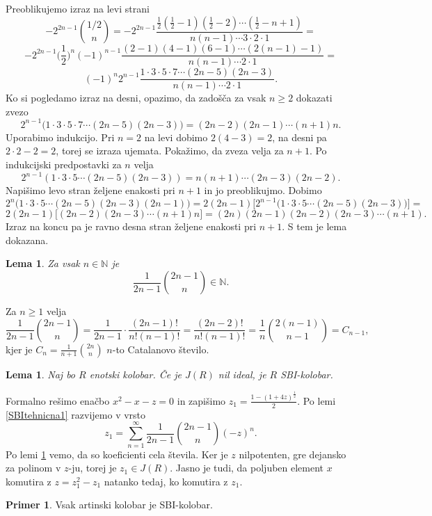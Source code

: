 \documentclass[a4paper, 12pt]{amsart}
\theoremstyle{definition} %
\newtheorem{primer}[definicija]{Primer}
\theoremstyle{plain} %
\newtheorem{lema}[definicija]{Lema}
\newcommand{\N}{\mathbb N}
\begin{document}
Preoblikujemo izraz na levi strani
$$
-2^{2n-1} {1/2 \choose n} = -2^{2n-1} \frac{\frac{1}{2}(\frac{1}{2}-1)(\frac{1}{2} - 2)\cdots(\frac{1}{2} - n+1) }{n(n-1)\cdots 3 \cdot 2 \cdot 1} =
$$
$$
-2^{2n-1}\big(\frac{1}{2}\big)^n (-1)^{n-1} \frac{(2-1)(4-1)(6-1)\cdots (2(n-1)-1)}{n(n-1)\cdots 2 \cdot1} = 
$$
$$
(-1)^n 2^{n-1} \frac{1\cdot 3 \cdot 5 \cdot 7 \cdots (2n-5)(2n-3)}{n(n-1)\cdots 2\cdot1}.
$$
Ko si pogledamo izraz na desni, opazimo, da zadošča za vsak $n\ge 2$ dokazati zvezo
$$
2^{n-1}\big( 1\cdot 3 \cdot 5 \cdot 7 \cdots(2n-5)(2n-3)   \big) = (2n-2) (2n-1) \cdots (n+1) n.
$$
Uporabimo indukcijo. Pri $n=2$ na levi dobimo $2(4-3) = 2$, na desni pa $2\cdot 2 - 2 = 2$, torej se izraza ujemata. Pokažimo, da zveza velja za $n+1$. Po indukcijski predpostavki za $n$ velja 
$$
2^{n-1} (1\cdot 3\cdot 5 \cdots (2n-5)(2n-3)) = n(n+1)\cdots (2n-3)(2n-2).
$$
Napišimo levo stran željene enakosti pri $n+1$ in jo preoblikujmo. Dobimo
$$
2^n \big(1\cdot 3 \cdot 5 \cdots (2n-5)(2n-3)(2n-1)\big) = 2(2n-1) \big[2^{n-1}\big(1\cdot 3 \cdot 5 \cdots (2n-5)(2n-3) \big)\big]=
$$
$$
2(2n-1) \big[(2n-2)(2n-3)\cdots(n+1)n\big] = (2n)(2n-1)(2n-2)(2n-3)\cdots (n+1).
$$
Izraz na koncu pa je ravno desna stran željene enakosti pri $n+1$. S tem je lema dokazana.
\endproof

\begin{lema}
\label{SBItehnicna2}
Za vsak $n\in \N$ je 
$$
\frac{1}{2n-1} {2n-1 \choose n} \in \N.
$$
\end{lema}

\proof
Za $n\ge 1$ velja 
$$
\frac{1}{2n-1} {2n-1 \choose n} = \frac{1}{2n-1}\cdot\frac{(2n-1)!}{n! (n-1)!} = \frac{(2n-2)!}{n!(n-1)!} = \frac{1}{n} {2(n-1) \choose n-1} = C_{n-1},
$$
kjer je $C_n = \frac{1}{n+1}{2n \choose n}$ $n$-to Catalanovo število. 
\endproof

\begin{lema}
\label{nilJeSBI}
Naj bo $R$ enotski kolobar. Če je $J(R)$ nil ideal, je $R$ SBI-kolobar.
\end{lema}

\proof
Formalno rešimo enačbo $x^2 - x - z = 0$ in zapišimo $z_1 = \frac{1-(1+4z)^{\frac{1}{2}}}{2}$. Po lemi \ref{SBItehnicna1} razvijemo v vrsto
$$
z_1 = \sum_{n=1}^{\infty} \frac{1}{2n-1} \binom{2n-1}{n}(-z)^n.
$$
Po lemi \ref{SBItehnicna2} vemo, da so koeficienti cela števila. Ker je $z$ nilpotenten, gre dejansko za polinom v $z$-ju, torej je $z_1 \in J(R)$. Jasno je tudi, da poljuben element $x$ komutira z $z=z_1^2 - z_1$ natanko tedaj, ko komutira z $z_1$.
\endproof

\begin{primer}
Vsak artinski kolobar je SBI-kolobar.
\end{primer}
\end{document}
